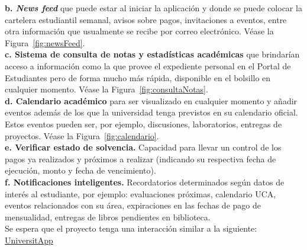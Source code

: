 \documentclass[12pt]{article}
\begin{document}
\textbf{b. \textit{News feed}} que puede estar al iniciar la aplicación y donde se puede colocar la cartelera estudiantil semanal, avisos sobre pagos, invitaciones a eventos, entre otra información que usualmente se recibe por correo electrónico. Véase la Figura~\ref{fig:newsFeed}.\\

\textbf{c. Sistema de consulta de notas y estadísticas académicas } que brindarían acceso a información como la que provee el expediente personal en el Portal de Estudiantes pero de forma mucho más rápida, disponible en el bolsillo en cualquier momento. Véase la Figura~\ref{fig:consultaNotas}.\\


\textbf{d. Calendario académico} para ser visualizado en cualquier momento y añadir eventos además de los que la universidad tenga previstos en su calendario oficial. Estos eventos pueden ser, por ejemplo, discusiones, laboratorios, entregas de proyectos. Véase la Figura~\ref{fig:calendario}.\\

\textbf{e. Verificar estado de solvencia. } Capacidad para llevar un control de los pagos ya realizados y pr\'oximos a realizar (indicando su respectiva fecha de ejecuci\'on, monto y fecha de vencimiento).\\

\textbf{f. Notificaciones inteligentes. }Recordatorios determinados seg\'un  datos de inter\'es al estudiante, por ejemplo: evaluaciones pr\'oximas, calendario UCA, eventos relacionados con su \'area, expiraciones en las fechas de pago de mensualidad, entregas de libros pendientes en biblioteca.\\

Se espera que el proyecto tenga una interacción similar a la siguiente: \href{https://marvelapp.com/14gff456}{UniversitApp}
\end{document}
